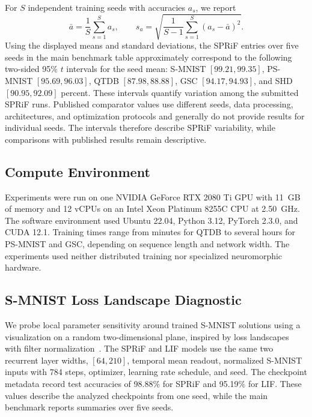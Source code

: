 \documentclass[letterpaper]{article}
\begin{document}
For $S$ independent training seeds with accuracies $a_s$, we report
\begin{equation}
\bar a=\frac{1}{S}\sum_{s=1}^{S}a_s,\qquad
s_a=\sqrt{\frac{1}{S-1}\sum_{s=1}^{S}(a_s-\bar a)^2}.
\label{eq:supp_seed_summary}
\end{equation}
Using the displayed means and standard deviations, the SPRiF entries over five seeds in the main benchmark table approximately correspond to the following two-sided 95\% $t$ intervals for the seed mean: S-MNIST $[99.21,99.35]$, PS-MNIST $[95.69,96.03]$, QTDB $[87.98,88.88]$, GSC $[94.17,94.93]$, and SHD $[90.95,92.09]$ percent. These intervals quantify variation among the submitted SPRiF runs. Published comparator values use different seeds, data processing, architectures, and optimization protocols and generally do not provide results for individual seeds. The intervals therefore describe SPRiF variability, while comparisons with published results remain descriptive.

\FloatBarrier

\subsection{Compute Environment}
\label{supp:sec:compute}

Experiments were run on one NVIDIA GeForce RTX 2080 Ti GPU with 11~GB of memory and 12 vCPUs on an Intel Xeon Platinum 8255C CPU at 2.50~GHz. The software environment used Ubuntu 22.04, Python 3.12, PyTorch 2.3.0, and CUDA 12.1. Training times range from minutes for QTDB to several hours for PS-MNIST and GSC, depending on sequence length and network width. The experiments used neither distributed training nor specialized neuromorphic hardware.

\subsection{S-MNIST Loss Landscape Diagnostic}
\label{supp:sec:loss-landscape}

We probe local parameter sensitivity around trained S-MNIST solutions using a visualization on a random two-dimensional plane, inspired by loss landscapes with filter normalization~\cite{li2018visualizing}. The SPRiF and LIF models use the same two recurrent layer widths, $[64,210]$, temporal mean readout, normalized S-MNIST inputs with 784 steps, optimizer, learning rate schedule, and seed. The checkpoint metadata record test accuracies of 98.88\% for SPRiF and 95.19\% for LIF. These values describe the analyzed checkpoints from one seed, while the main benchmark reports summaries over five seeds.
\end{document}
